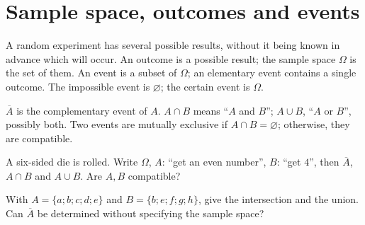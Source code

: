 \section{Sample space, outcomes and events}
\begin{keypoint}[Vocabulary]
A random experiment has several possible results, without it being known in advance which will occur. An outcome is a possible result; the sample space $\Omega$ is the set of them. An event is a subset of $\Omega$; an elementary event contains a single outcome.
The impossible event is $\varnothing$; the certain event is $\Omega$.
\end{keypoint}
\begin{keypoint}
$\overline A$ is the complementary event of $A$. $A\cap B$ means ``$A$ and $B$''; $A\cup B$, ``$A$ or $B$'', possibly both. Two events are mutually exclusive if $A\cap B=\varnothing$; otherwise, they are compatible.
\end{keypoint}
\begin{example}A six-sided die is rolled. Write $\Omega$, $A$: ``get an even number'', $B$: ``get $4$'', then $\overline A$, $A\cap B$ and $A\cup B$. Are $A,B$ compatible?\end{example}
\begin{example}With $A=\{a;b;c;d;e\}$ and $B=\{b;e;f;g;h\}$, give the intersection and the union. Can $\overline A$ be determined without specifying the sample space?\end{example}

